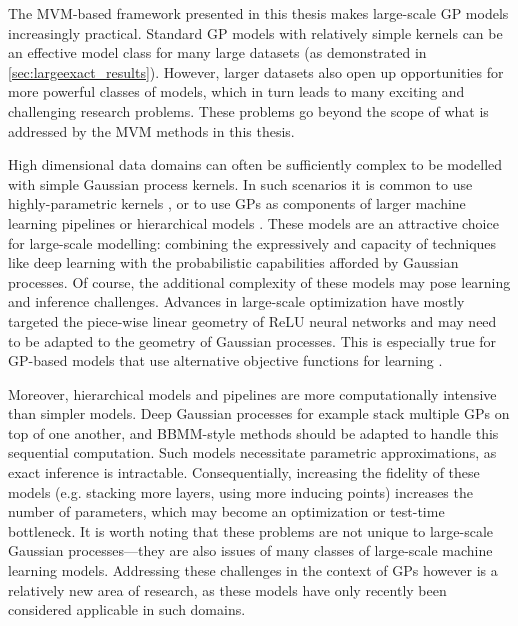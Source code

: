 The MVM-based framework presented in this thesis makes large-scale GP models increasingly practical.
Standard GP models with relatively simple kernels can be an effective model class for many large datasets (as demonstrated in \cref{sec:largeexact_results}).
However, larger datasets also open up opportunities for more powerful classes of models, which in turn leads to many exciting and challenging research problems.
These problems go beyond the scope of what is addressed by the MVM methods in this thesis.

High dimensional data domains can often be sufficiently complex to be modelled with simple Gaussian process kernels.
In such scenarios it is common to use highly-parametric kernels \cite{wilson2013gaussian,wilson2016stochastic},
or to use GPs as components of larger machine learning pipelines \cite{schulam2015framework,futoma2017learning} or hierarchical models \cite{wilson2012gaussian,salimbeni2017doubly,jankowiak2020deep}.
These models are an attractive choice for large-scale modelling: combining the expressively and capacity of techniques like deep learning with the probabilistic capabilities afforded by Gaussian processes.
Of course, the additional complexity of these models may pose learning and inference challenges.
Advances in large-scale optimization have mostly targeted the piece-wise linear geometry of ReLU neural networks and may need to be adapted to the geometry of Gaussian processes.
This is especially true for GP-based models that use alternative objective functions for learning \cite{sheth2017excess,knoblauch2019generalized,jankowiak2020parametric}.

Moreover, hierarchical models and pipelines are more computationally intensive than simpler models.
Deep Gaussian processes for example stack multiple GPs on top of one another, and BBMM-style methods should be adapted to handle this sequential computation.
Such models necessitate parametric approximations, as exact inference is intractable.
Consequentially, increasing the fidelity of these models (e.g. stacking more layers, using more inducing points) increases the number of parameters, which may become an optimization or test-time bottleneck.
It is worth noting that these problems are not unique to large-scale Gaussian processes---they are also issues of many classes of large-scale machine learning models.
Addressing these challenges in the context of GPs however is a relatively new area of research, as these models have only recently been considered applicable in such domains.




